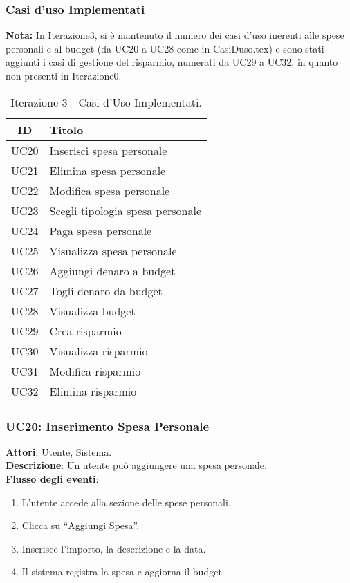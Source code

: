 \subsubsection{Casi d'uso Implementati}

\textbf{Nota:} In Iterazione3, si è mantenuto il numero dei casi d’uso inerenti alle spese personali e al budget (da UC20 a UC28 come in CasiDuso.tex) e sono stati aggiunti i casi di gestione del risparmio, numerati da UC29 a UC32, in quanto non presenti in Iterazione0.

\begin{table}[h]
    \centering
    \begin{tabular}{|c|l|}
    \hline
    \textbf{ID} & \textbf{Titolo} \\ \hline
    UC20 & Inserisci spesa personale \\ \hline
    UC21 & Elimina spesa personale \\ \hline
    UC22 & Modifica spesa personale \\ \hline
    UC23 & Scegli tipologia spesa personale \\ \hline
    UC24 & Paga spesa personale \\ \hline
    UC25 & Visualizza spesa personale \\ \hline
    UC26 & Aggiungi denaro a budget \\ \hline
    UC27 & Togli denaro da budget \\ \hline
    UC28 & Visualizza budget \\ \hline
    UC29 & Crea risparmio \\ \hline
    UC30 & Visualizza risparmio \\ \hline
    UC31 & Modifica risparmio \\ \hline
    UC32 & Elimina risparmio \\ \hline
    \end{tabular}
    \caption{Iterazione 3 - Casi d’Uso Implementati.}
\end{table}

\subsubsection{UC20: Inserimento Spesa Personale}
\textbf{Attori}: Utente, Sistema. \\
\textbf{Descrizione}: Un utente può aggiungere una spesa personale. \\
\textbf{Flusso degli eventi}:
\begin{enumerate}
    \item L’utente accede alla sezione delle spese personali.
    \item Clicca su ``Aggiungi Spesa''.
    \item Inserisce l’importo, la descrizione e la data.
    \item Il sistema registra la spesa e aggiorna il budget.
\end{enumerate}

